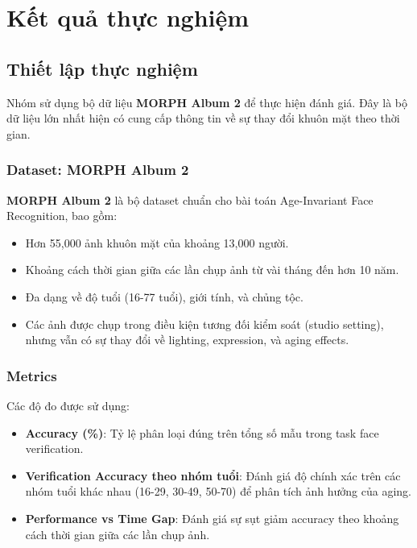 \chapter{Kết quả thực nghiệm}

\section{Thiết lập thực nghiệm}

Nhóm sử dụng bộ dữ liệu \textbf{MORPH Album 2} để thực hiện đánh giá. Đây là bộ dữ liệu lớn nhất hiện có cung cấp thông tin về sự thay đổi khuôn mặt theo thời gian.

\subsection{Dataset: MORPH Album 2}

\textbf{MORPH Album 2} là bộ dataset chuẩn cho bài toán Age-Invariant Face Recognition, bao gồm:

\begin{itemize}
    \item Hơn 55,000 ảnh khuôn mặt của khoảng 13,000 người.
    \item Khoảng cách thời gian giữa các lần chụp ảnh từ vài tháng đến hơn 10 năm.
    \item Đa dạng về độ tuổi (16-77 tuổi), giới tính, và chủng tộc.
    \item Các ảnh được chụp trong điều kiện tương đối kiểm soát (studio setting), nhưng vẫn có sự thay đổi về lighting, expression, và aging effects.
\end{itemize}

\subsection{Metrics}

Các độ đo được sử dụng:

\begin{itemize}
    \item \textbf{Accuracy (\%)}: Tỷ lệ phân loại đúng trên tổng số mẫu trong task face verification.
    \item \textbf{Verification Accuracy theo nhóm tuổi}: Đánh giá độ chính xác trên các nhóm tuổi khác nhau (16-29, 30-49, 50-70) để phân tích ảnh hưởng của aging.
    \item \textbf{Performance vs Time Gap}: Đánh giá sự sụt giảm accuracy theo khoảng cách thời gian giữa các lần chụp ảnh.
\end{itemize}

